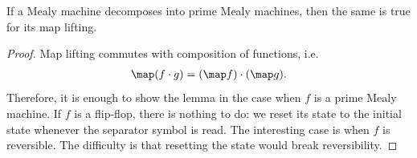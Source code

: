 \begin{lemma}\label{lem:map-lifting-decomposition-mealy}
    If a Mealy machine decomposes into prime Mealy machines, then the same is true for its map lifting.
\end{lemma}
\begin{proof}
    Map lifting commutes with composition of functions, i.e.
    \begin{align*}
    \map(f \cdot g) = (\map f) \cdot (\map g).
    \end{align*}
    Therefore, it is enough to show the lemma in the case when $f$ is a prime Mealy machine. If $f$ is a flip-flop, there is nothing to do:  we reset its state to the initial state whenever the separator symbol is read. The interesting case is when $f$ is reversible. The difficulty is that resetting the state would break reversibility. 


\end{proof}
